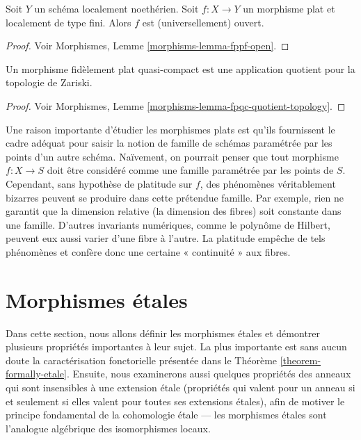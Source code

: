 \begin{theorem}
\label{theorem-flat-map-open}
Soit $Y$ un schéma localement noethérien.
Soit $f : X \to Y$ un morphisme plat et localement de type fini.
Alors $f$ est (universellement) ouvert.
\end{theorem}

\begin{proof}
Voir Morphismes, Lemme \ref{morphisms-lemma-fppf-open}.
\end{proof}

\begin{theorem}
\label{theorem-flat-is-quotient}
Un morphisme fidèlement plat quasi-compact est une application quotient pour
la topologie de Zariski.
\end{theorem}

\begin{proof}
Voir Morphismes, Lemme \ref{morphisms-lemma-fpqc-quotient-topology}.
\end{proof}

\noindent
Une raison importante d'étudier les morphismes plats est qu'ils fournissent le cadre
adéquat pour saisir la notion de famille de schémas paramétrée par les
points d'un autre schéma. Naïvement, on pourrait penser que tout morphisme $f : X \to S$
doit être considéré comme une famille paramétrée par les points de $S$. Cependant,
sans hypothèse de platitude sur $f$, des phénomènes véritablement bizarres peuvent se produire dans
cette prétendue famille. Par exemple, rien ne garantit que la dimension relative
(la dimension des fibres) soit constante dans une famille. D'autres invariants numériques,
comme le polynôme de Hilbert, peuvent eux aussi varier d'une fibre à
l'autre. La platitude empêche de tels phénomènes et confère donc
une certaine « continuité » aux fibres.


\section{Morphismes \'etales}
\label{section-etale-morphisms}

\noindent
Dans cette section, nous allons définir les morphismes \'etales et démontrer plusieurs
propriétés importantes à leur sujet. La plus importante est sans aucun doute la
caractérisation fonctorielle présentée dans le Théorème \ref{theorem-formally-etale}.
Ensuite, nous examinerons aussi quelques propriétés des anneaux qui sont
insensibles à une extension \'etale (propriétés qui valent pour un anneau
si et seulement si elles valent pour toutes ses extensions \'etales), afin de motiver le
principe fondamental de la cohomologie \'etale --- les morphismes \'etales sont l'analogue algébrique des
isomorphismes locaux.

